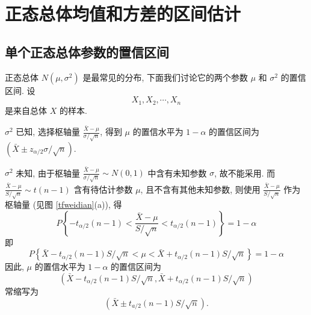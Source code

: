 \section{正态总体均值和方差的区间估计}

\subsection{单个正态总体参数的置信区间}

正态总体 $ N\left(\mu, \sigma^{2}\right) $ 是最常见的分布, 
下面我们讨论它的两个参数 $ \mu $ 和 $ \sigma^{2} $ 的置信区间.
设 $$ X_{1}, X_{2}, \cdots, X_{n} $$ 是来自总体 $ X $ 的样本.
\begin{theorem}
    $\sigma^{2} $ 已知, 选择枢轴量 $\displaystyle \frac{\bar{X}-\mu}{\sigma / \sqrt{n}}$, 
    得到 $ \mu $ 的置信水平为 $ 1-\alpha $ 的置信区间为 $ \left(\bar{X} \pm z_{\alpha / 2} \sigma / \sqrt{n}\right) .$
\end{theorem}
\begin{theorem}
    $\sigma^{2} $ 未知, 由于枢轴量 $\displaystyle \frac{\bar{X}-\mu}{\sigma / \sqrt{n}} \sim N(0,1) $ 中含有未知参数 $ \sigma $, 
    故不能采用. 而 $\displaystyle \frac{\bar{X}-\mu}{S / \sqrt{n}} \sim t(n-1)$ 含有待估计参数 $ \mu $, 
    且不含有其他未知参数, 则使用 $\displaystyle \frac{\bar{X}-\mu}{S / \sqrt{n}} $ 作为枢轴量 (见图 \ref{tfweidian}(a)), 得
    $$P\left\{-t_{\alpha / 2}(n-1)<\frac{\bar{X}-\mu}{S / \sqrt{n}}<t_{\alpha / 2}(n-1)\right\}=1-\alpha$$
    即
    $$P\left\{\bar{X}-t_{\alpha / 2}(n-1) S / \sqrt{n}<\mu<\bar{X}+t_{\alpha / 2}(n-1) S / \sqrt{n}\right\}=1-\alpha$$
    因此, $\mu $ 的置信水平为 $ 1-\alpha $ 的置信区间为
    $$\left(\bar{X}-t_{\alpha / 2}(n-1) S / \sqrt{n}, \bar{X}+t_{\alpha / 2}(n-1) S / \sqrt{n}\right)$$
    常缩写为 $$\left(\bar{X} \pm t_{a / 2}(n-1) S / \sqrt{n}\right) .$$
\end{theorem}

